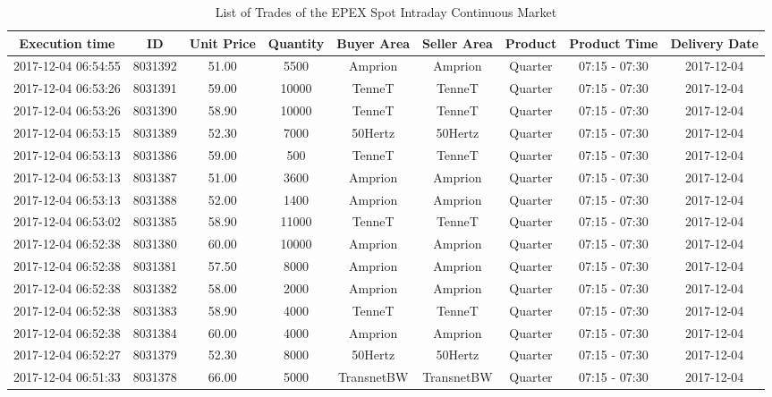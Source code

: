\documentclass[a4paper, 12pt]{article}
\begin{document}
{\captionsetup[table]{aboveskip=0.5cm}
\begin{table}
\caption{List of Trades of the EPEX Spot Intraday Continuous Market \label{table-spot-market}}
\centering
\begin{tabular}{c|cccccccc}
\hline
\hline
Execution time & ID & Unit Price & Quantity & Buyer Area & Seller Area & Product & Product Time & Delivery Date\\
\hline
2017-12-04 06:54:55 & 8031392 & 51.00 & 5500 & Amprion & Amprion & Quarter & 07:15 - 07:30 & 2017-12-04\\
2017-12-04 06:53:26 & 8031391 & 59.00 & 10000 & TenneT & TenneT & Quarter & 07:15 - 07:30 & 2017-12-04\\
2017-12-04 06:53:26 & 8031390 & 58.90 & 10000 & TenneT & TenneT & Quarter & 07:15 - 07:30 & 2017-12-04\\
2017-12-04 06:53:15 & 8031389 & 52.30 & 7000 & 50Hertz & 50Hertz & Quarter & 07:15 - 07:30 & 2017-12-04\\
2017-12-04 06:53:13 & 8031386 & 59.00 & 500 & TenneT & TenneT & Quarter & 07:15 - 07:30 & 2017-12-04\\
2017-12-04 06:53:13 & 8031387 & 51.00 & 3600 & Amprion & Amprion & Quarter & 07:15 - 07:30 & 2017-12-04\\
2017-12-04 06:53:13 & 8031388 & 52.00 & 1400 & Amprion & Amprion & Quarter & 07:15 - 07:30 & 2017-12-04\\
2017-12-04 06:53:02 & 8031385 & 58.90 & 11000 & TenneT & TenneT & Quarter & 07:15 - 07:30 & 2017-12-04\\
2017-12-04 06:52:38 & 8031380 & 60.00 & 10000 & Amprion & Amprion & Quarter & 07:15 - 07:30 & 2017-12-04\\
2017-12-04 06:52:38 & 8031381 & 57.50 & 8000 & Amprion & Amprion & Quarter & 07:15 - 07:30 & 2017-12-04\\
2017-12-04 06:52:38 & 8031382 & 58.00 & 2000 & Amprion & Amprion & Quarter & 07:15 - 07:30 & 2017-12-04\\
2017-12-04 06:52:38 & 8031383 & 58.90 & 4000 & TenneT & TenneT & Quarter & 07:15 - 07:30 & 2017-12-04\\
2017-12-04 06:52:38 & 8031384 & 60.00 & 4000 & Amprion & Amprion & Quarter & 07:15 - 07:30 & 2017-12-04\\
2017-12-04 06:52:27 & 8031379 & 52.30 & 8000 & 50Hertz & 50Hertz & Quarter & 07:15 - 07:30 & 2017-12-04\\
2017-12-04 06:51:33 & 8031378 & 66.00 & 5000 & TransnetBW & TransnetBW & Quarter & 07:15 - 07:30 & 2017-12-04\\

\end{tabular}
\end{table}}
\end{document}
